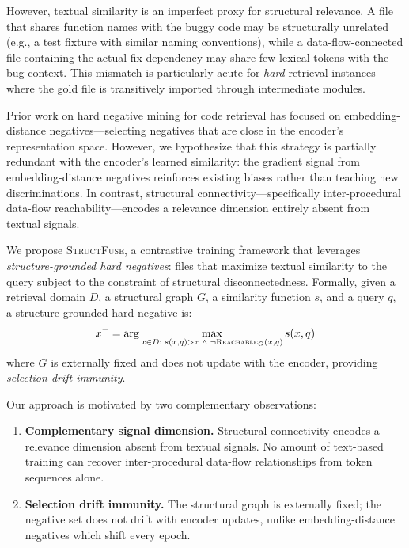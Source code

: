 \documentclass[11pt]{article}
\begin{document}
However, textual similarity is an imperfect proxy for structural relevance.
A file that shares function names with the buggy code may be structurally unrelated (e.g., a test fixture with similar naming conventions), while a data-flow-connected file containing the actual fix dependency may share few lexical tokens with the bug context.
This mismatch is particularly acute for \emph{hard} retrieval instances where the gold file is transitively imported through intermediate modules.

Prior work on hard negative mining for code retrieval has focused on embedding-distance negatives---selecting negatives that are close in the encoder's representation space.
However, we hypothesize that this strategy is partially redundant with the encoder's learned similarity: the gradient signal from embedding-distance negatives reinforces existing biases rather than teaching new discriminations.
In contrast, structural connectivity---specifically inter-procedural data-flow reachability---encodes a relevance dimension entirely absent from textual signals.

We propose \textsc{StructFuse}, a contrastive training framework that leverages \emph{structure-grounded hard negatives}: files that maximize textual similarity to the query subject to the constraint of structural disconnectedness.
Formally, given a retrieval domain $D$, a structural graph $G$, a similarity function $s$, and a query $q$, a structure-grounded hard negative is:
\begin{equation}
  x^{-} = \arg\max_{x \in D:\; s(x,q) > \tau \;\wedge\; \neg\textsc{Reachable}_G(x, q)} s(x, q)
\label{eq:neg}
\end{equation}
where $G$ is externally fixed and does not update with the encoder, providing \emph{selection drift immunity}.

Our approach is motivated by two complementary observations:
\begin{enumerate}[nosep]
  \item \textbf{Complementary signal dimension.} Structural connectivity encodes a relevance dimension absent from textual signals. No amount of text-based training can recover inter-procedural data-flow relationships from token sequences alone.
  \item \textbf{Selection drift immunity.} The structural graph is externally fixed; the negative set does not drift with encoder updates, unlike embedding-distance negatives which shift every epoch.
\end{enumerate}
\end{document}
